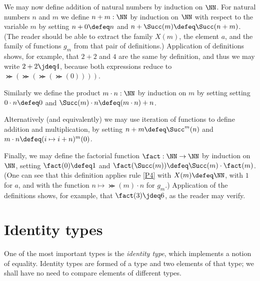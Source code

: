We may now define addition of natural numbers by induction on $\NN$.  For natural numbers $n$ and $m$ we define $n+m : \NN$ by induction on
$\NN$ with respect to the variable $m$ by setting $n+0\defeq n$ and $n+\Succ(m)\defeq \Succ(n+m)$.  (The reader should be able to extract the
family $X(m)$, the element $a$, and the family of functions $g_m$ from that pair of definitions.)  Application of definitions shows, for
example, that $2+2$ and $4$ are the same by definition, and thus we may write $2+2 \jdeq 4$, because both expressions reduce to
$\Succ(\Succ(\Succ(\Succ(0))))$.

Similarly we define the product $m \cdot n : \NN$ by induction on $m$ by setting setting $ 0 \cdot n \defeq 0$ and
$ \Succ(m) \cdot n \defeq (m \cdot n) + n$.

Alternatively (and equivalently) we may use iteration of functions to define addition and multiplication, by setting $n+m \defeq \Succ^m(n)$ and
$m \cdot n \defeq ( i \mapsto i + n )^m (0) $.

Finally, we may define the factorial function%
$\fact : \NN \to \NN$ by induction on $\NN$, setting $\fact(0) \defeq 1$ and
$\fact(\Succ(m)) \defeq \Succ(m) \cdot \fact(m)$.  (One can see that this definition applies rule \ref{P4} with $X(m) \defeq \NN$, with $1$ for
$a$, and with the function $n \mapsto \Succ(m) \cdot n$ for $g_m$.)  Application of the definitions shows, for example, that $\fact(3) \jdeq 6$, as
the reader may verify.

\section{Identity types}
\label{sec:identity-types}

One of the most important types is the \emph{identity type},
which implements a notion of equality.
Identity types are formed of a type and two elements of that type;
we shall have no need to compare elements of different types.

